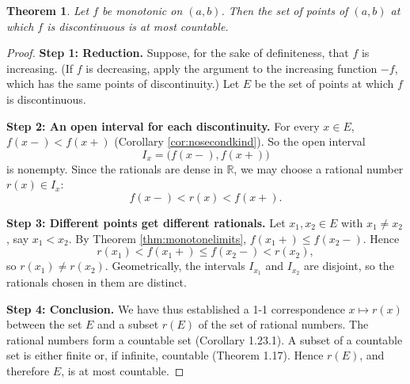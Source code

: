 \documentclass{article}
\theoremstyle{mythm}
\newtheorem{theorem}{Theorem}[section]
\begin{document}
\begin{theorem}\label{thm:countable}
Let $f$ be monotonic on $(a,b)$. Then the set of points of $(a,b)$ at which $f$ is discontinuous is at most countable.
\end{theorem}

\begin{proof}
\textbf{Step 1: Reduction.} Suppose, for the sake of definiteness, that $f$ is increasing. (If $f$ is decreasing, apply the argument to the increasing function $-f$, which has the same points of discontinuity.) Let $E$ be the set of points at which $f$ is discontinuous.

\textbf{Step 2: An open interval for each discontinuity.} For every $x \in E$, $f(x-) < f(x+)$ (Corollary \ref{cor:nosecondkind}). So the open interval
\[
I_x = \big(f(x-), f(x+)\big)
\]
is nonempty. Since the rationals are dense in $\mathbb{R}$, we may choose a rational number $r(x) \in I_x$:
\[
f(x-) < r(x) < f(x+).
\]

\textbf{Step 3: Different points get different rationals.} Let $x_1, x_2 \in E$ with $x_1 \neq x_2$, say $x_1 < x_2$. By Theorem \ref{thm:monotonelimits}, $f(x_1+) \leq f(x_2-)$. Hence
\[
r(x_1) < f(x_1+) \leq f(x_2-) < r(x_2),
\]
so $r(x_1) \neq r(x_2)$. Geometrically, the intervals $I_{x_1}$ and $I_{x_2}$ are disjoint, so the rationals chosen in them are distinct.

\textbf{Step 4: Conclusion.} We have thus established a 1-1 correspondence $x \mapsto r(x)$ between the set $E$ and a subset $r(E)$ of the set of rational numbers. The rational numbers form a countable set (Corollary 1.23.1). A subset of a countable set is either finite or, if infinite, countable (Theorem 1.17). Hence $r(E)$, and therefore $E$, is at most countable.
\end{proof}
\end{document}
